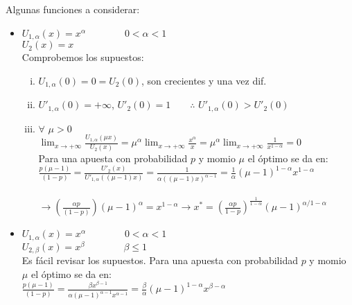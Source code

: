 Algunas funciones a considerar:
\begin{itemize}
 \item $U_{1,\alpha}(x)=x^{\alpha}\qquad\qquad 0<\alpha<1$\\ 
 $U_2(x)=x$\\
 
 Comprobemos los supuestos:
 \begin{enumerate}[(i)]
  \item $U_{1,\alpha}(0)=0=U_2(0)$, son crecientes y una vez dif.
  \item $U'_{1,\alpha}(0)=+\infty$, $U'_2(0)=1\qquad{\therefore \,\, U'_{1,\alpha}(0)>U'_2(0)}$
  \item $\forall \,\, \mu>0$\\
  
  $\displaystyle\lim_{x\rightarrow +\infty}\displaystyle\frac{U_{1,\alpha}(\mu x)}{U_2(x)}=\mu^{\alpha}\displaystyle\lim_{x\rightarrow +\infty}\displaystyle\frac{x^{\alpha}}{x}=\mu^{\alpha}\displaystyle\lim_{x\rightarrow +\infty}\displaystyle\frac{1}{x^{1-\alpha}}=0$\\
  
  Para una apuesta con probabilidad $p$ y momio $\mu$ el óptimo se da en:\\
  
  $\displaystyle{\frac{p(\mu-1)}{(1-p)}=\frac{U'_2(x)}{U'_{1,\alpha}((\mu-1)x)}=\frac{1}{\alpha((\mu-1)x)^{\alpha-1}}=\frac{1}{\alpha}(\mu-1)^{1-\alpha}x^{1-\alpha}}$\\\\
  
  $\rightarrow \left(\displaystyle\frac{\alpha p}{(1-p)}\right)(\mu-1)^{\alpha}=x^{1-\alpha}\rightarrow x^*=\left(\displaystyle\frac{\alpha p}{1-p}\right)^{\frac{1}{1-\alpha}}(\mu-1)^{\alpha/1-\alpha}$\\
 \end{enumerate}

 \item $U_{1,\alpha}(x)=x^{\alpha}\qquad\qquad 0<\alpha<1$\\
 $U_{2,\beta}(x)=x^{\beta}\qquad\qquad \beta \le1$\\
 
 Es fácil revisar los supuestos. Para una apuesta con probabilidad $p$ y momio $\mu$ el óptimo se da en:\\
 
 ${\displaystyle\frac{p(\mu-1)}{(1-p)}=\frac{\beta x^{\beta-1}}{\alpha(\mu-1)^{\alpha-1}x^{\alpha-1}}=\frac{\beta}{\alpha}(\mu-1)^{1-\alpha}x^{\beta-\alpha}}$\\
 

\end{itemize}
